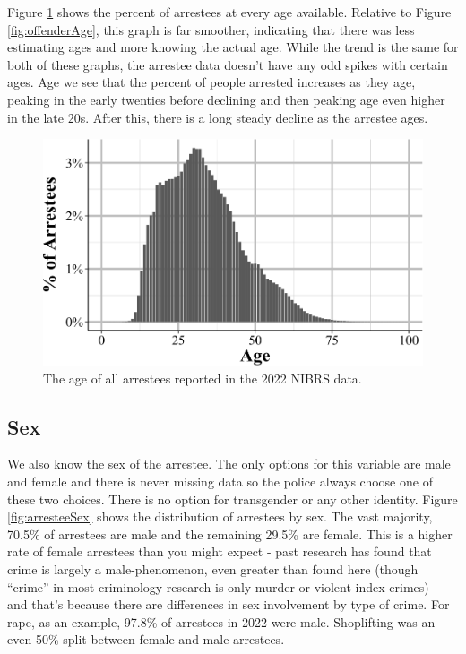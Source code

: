 \documentclass[
  12pt,
  openany]{book}
\begin{document}
Figure \ref{fig:arresteeAge} shows the percent of arrestees at every age available. Relative to Figure \ref{fig:offenderAge}, this graph is far smoother, indicating that there was less estimating ages and more knowing the actual age. While the trend is the same for both of these graphs, the arrestee data doesn't have any odd spikes with certain ages. Age we see that the percent of people arrested increases as they age, peaking in the early twenties before declining and then peaking age even higher in the late 20s. After this, there is a long steady decline as the arrestee ages.

\begin{figure}

{\centering \includegraphics[width=0.9\linewidth]{16_nibrs_arrestee_files/figure-latex/arresteeAge-1} 

}

\caption{The age of all arrestees reported in the 2022 NIBRS data.}\label{fig:arresteeAge}
\end{figure}

\subsection{Sex}\label{sex-3}

We also know the sex of the arrestee. The only options for this variable are male and female and there is never missing data so the police always choose one of these two choices. There is no option for transgender or any other identity. Figure \ref{fig:arresteeSex} shows the distribution of arrestees by sex. The vast majority, 70.5\% of arrestees are male and the remaining 29.5\% are female. This is a higher rate of female arrestees than you might expect - past research has found that crime is largely a male-phenomenon, even greater than found here (though ``crime'' in most criminology research is only murder or violent index crimes) - and that's because there are differences in sex involvement by type of crime. For rape, as an example, 97.8\% of arrestees in 2022 were male. Shoplifting was an even 50\% split between female and male arrestees.
\end{document}
